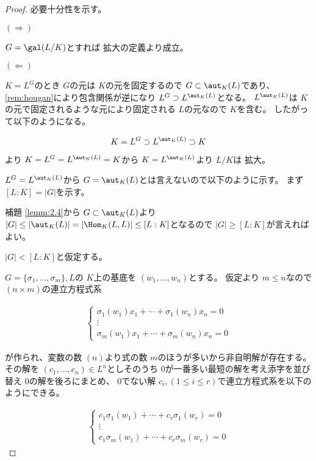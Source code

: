 \documentclass[../master_galois_theory]{subfiles}
\begin{document}
\begin{proof}
  必要十分性を示す。

  $(\Rightarrow)$

  $G = \gal(L/K)$とすれば \galois 拡大の定義より成立。

  $(\Leftarrow)$

  $K = L^G$のとき $G$の元は $K$の元を固定するので $G \subset \aut_K(L)$であり、
  \rm{\ref{rem:hougan}}により包含関係が逆になり $L^G \supset L^{\aut_K(L)}$となる。
  $L^{\aut_K(L)}$は $K$の元で固定されるような元により固定される $L$の元なので $K$を含む。
  したがって以下のようになる。

  \[
  K = L^G \supset L^{\aut_K(L)} \supset K
  \]

  より $K = L^G = L^{\aut_K(L)} = K$から $ K = L^{\aut_K(L)}$より $L/K$は \galois 拡大。

  $L^G = L^{\aut_K(L)}$から $G = \aut_K(L)$とは言えないので以下のように示す。
  まず $[L:K] = |G|$を示す。

  補題 \rm{\ref{lemm:2.4}}から $G \subset \aut_K(L)$より
  $|G| \leq |\aut_K(L)| = |\Hom_K(L,L)| \leq [L:K]$となるので $|G| \geq [L:K]$が言えればよい。

  $|G| < [L:K]$と仮定する。

  $G = \{ \sigma_1 , \dots , \sigma_m \} , L$の $K$上の基底を $(w_1 , \dots , w_n)$とする。
  仮定より $m \leq n$なので $(n \times m)$の連立方程式系

  \begin{eqnarray*}
    \begin{cases}
        \sigma_1(w_1) x_1 + \cdots + \sigma_1(w_n) x_n  =  0 \\
        \vdots \\
        \sigma_m(w_1) x_1 + \cdots + \sigma_m(w_n) x_n  =  0
    \end{cases}
  \end{eqnarray*}

  が作られ、変数の数 $(n)$より式の数 $m$のほうが多いから非自明解が存在する。
  その解を $(c_1 , \dots , c_n) \in L^n$としそのうち $0$が一番多い最短の解を考え添字を並び替え $0$の解を後ろにまとめ、 $0$でない解 $c_i , (1 \leq i \leq r)$で連立方程式系を以下のようにできる。

  \begin{eqnarray} \label{eq:c}
    \begin{cases}
        c_1 \sigma_1(w_1) + \cdots + c_r \sigma_1(w_r) = 0 \\
        \vdots \\
        c_1 \sigma_m(w_1) + \cdots + c_r \sigma_m(w_r) = 0
    \end{cases}
  \end{eqnarray}


\end{proof}
\end{document}
